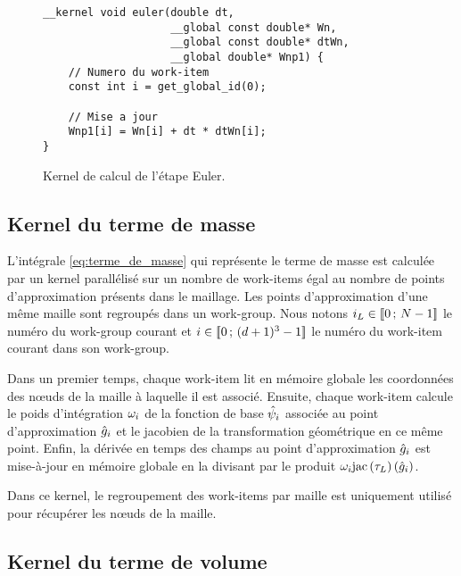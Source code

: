 \begin{figure}[h]
	\begin{center}
		\caption{
			\label{img:kernel_euler}
			Kernel de calcul de l’étape Euler.
		}

		\begin{lstlisting}
__kernel void euler(double dt,
                    __global const double* Wn,
                    __global const double* dtWn,
                    __global double* Wnp1) {
    // Numero du work-item
    const int i = get_global_id(0);
    
    // Mise a jour
    Wnp1[i] = Wn[i] + dt * dtWn[i];
}
		\end{lstlisting}
	\end{center}
\end{figure}



\subsection{Kernel du terme de masse}
\label{ssect:kernel_masse}


L’intégrale \eqref{eq:terme_de_masse} qui représente le terme de masse
est calculée par un kernel parallélisé sur un nombre de work-items égal au nombre
de points d'approximation présents dans le maillage.
Les points d'approximation d'une même maille sont regroupés dans un work-group.
Nous notons $i_{L} \in \lbrack\!\lbrack0\,;\,N - 1\rbrack\!\rbrack$ le numéro du
work-group courant et $i \in \lbrack\!\lbrack0\,;\,(d + 1)^3 - 1\rbrack\!\rbrack$ le numéro
du work-item courant dans son work-group.


Dans un premier temps, chaque work-item lit en mémoire globale les coordonnées
des nœuds de la maille à laquelle il est associé. Ensuite, chaque work-item calcule
le poids d'intégration $\omega_{i}$ de la fonction de base $\hat{\psi}_{i}$
associée au point d'approximation $\hat{g}_{i}$ et le jacobien de la
transformation géométrique en ce même point.
Enfin, la dérivée en temps des champs au point d'approximation $\hat{g}_{i}$
est mise-à-jour en mémoire globale en la divisant par le produit
$\omega_{i} \mathrm{jac}\left(\tau_{L}\right) (\hat{g}_{i})$.

Dans ce kernel, le regroupement des work-items par maille est uniquement utilisé
pour récupérer les nœuds de la maille.
\\




\subsection{Kernel du terme de volume}
\label{ssect:kernel_volume}


